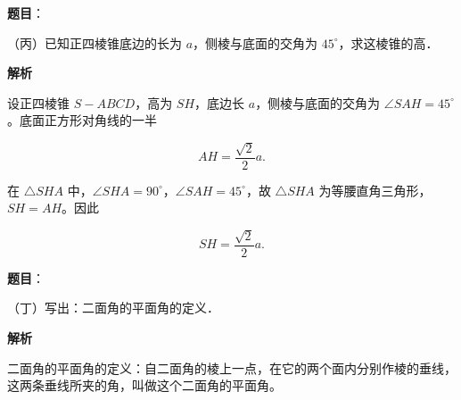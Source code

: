 \begin{answer}

\textbf{题目}：

（丙）已知正四棱锥底边的长为 $a$，侧棱与底面的交角为 $45^\circ$，求这棱锥的高．

\textbf{解析}

设正四棱锥 $S-ABCD$，高为 $SH$，底边长 $a$，侧棱与底面的交角为 $\angle SAH=45^\circ$。底面正方形对角线的一半

\nopagebreak[4]
\[
AH=\frac{\sqrt2}{2}a.
\]

在 $\triangle SHA$ 中，$\angle SHA=90^\circ$，$\angle SAH=45^\circ$，故 $\triangle SHA$ 为等腰直角三角形，$SH=AH$。因此

\nopagebreak[4]
\[
SH=\frac{\sqrt2}{2}a.
\]


\end{answer}
\begin{answer}

\textbf{题目}：

（丁）写出：二面角的平面角的定义．

\textbf{解析}

二面角的平面角的定义：自二面角的棱上一点，在它的两个面内分别作棱的垂线，这两条垂线所夹的角，叫做这个二面角的平面角。


\par\medskip

\end{answer}

